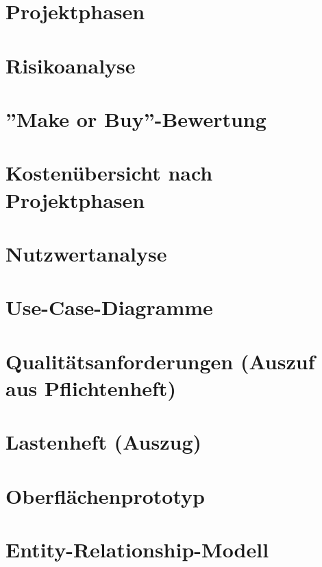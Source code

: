 \begin{appendices}

	
	\section{Projektphasen}		
		
		\newpage

	\section{Risikoanalyse}		
		
		\newpage		
		
	\section{''Make or Buy''-Bewertung}		
		
		\newpage
	
	\section{Kostenübersicht nach Projektphasen}		
		
		\newpage

	\section{Nutzwertanalyse}		
		
		\newpage
		
	\section{Use-Case-Diagramme}		
		
		\newpage		
		
	\section{Qualitätsanforderungen (Auszuf aus Pflichtenheft)}		
		
		\newpage
		
	\section{Lastenheft (Auszug)}
		
		\newpage
		
	\section{Oberflächenprototyp}
		
		\newpage
		
	\section{Entity-Relationship-Modell}
		
		\newpage
		
\end{appendices}